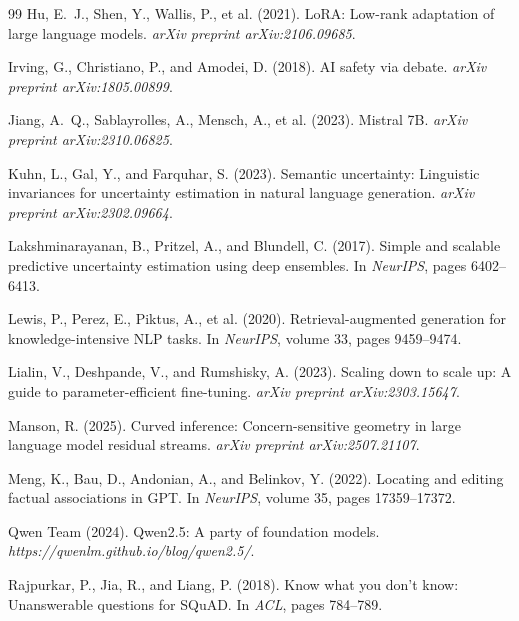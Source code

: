 \documentclass[11pt,a4paper]{article}
\begin{document}
\begin{thebibliography}{99}
Hu, E.~J., Shen, Y., Wallis, P., et al. (2021).
\newblock LoRA: Low-rank adaptation of large language models.
\newblock \emph{arXiv preprint arXiv:2106.09685}.

Irving, G., Christiano, P., and Amodei, D. (2018).
\newblock AI safety via debate.
\newblock \emph{arXiv preprint arXiv:1805.00899}.

Jiang, A.~Q., Sablayrolles, A., Mensch, A., et al. (2023).
\newblock Mistral 7B.
\newblock \emph{arXiv preprint arXiv:2310.06825}.

Kuhn, L., Gal, Y., and Farquhar, S. (2023).
\newblock Semantic uncertainty: Linguistic invariances for uncertainty estimation in natural language generation.
\newblock \emph{arXiv preprint arXiv:2302.09664}.

Lakshminarayanan, B., Pritzel, A., and Blundell, C. (2017).
\newblock Simple and scalable predictive uncertainty estimation using deep ensembles.
\newblock In \emph{NeurIPS}, pages 6402--6413.

Lewis, P., Perez, E., Piktus, A., et al. (2020).
\newblock Retrieval-augmented generation for knowledge-intensive NLP tasks.
\newblock In \emph{NeurIPS}, volume 33, pages 9459--9474.

Lialin, V., Deshpande, V., and Rumshisky, A. (2023).
\newblock Scaling down to scale up: A guide to parameter-efficient fine-tuning.
\newblock \emph{arXiv preprint arXiv:2303.15647}.

Manson, R. (2025).
\newblock Curved inference: Concern-sensitive geometry in large language model residual streams.
\newblock \emph{arXiv preprint arXiv:2507.21107}.

Meng, K., Bau, D., Andonian, A., and Belinkov, Y. (2022).
\newblock Locating and editing factual associations in GPT.
\newblock In \emph{NeurIPS}, volume 35, pages 17359--17372.

Qwen Team (2024).
\newblock Qwen2.5: A party of foundation models.
\newblock \emph{https://qwenlm.github.io/blog/qwen2.5/}.

Rajpurkar, P., Jia, R., and Liang, P. (2018).
\newblock Know what you don't know: Unanswerable questions for SQuAD.
\newblock In \emph{ACL}, pages 784--789.


\end{thebibliography}
\end{document}
